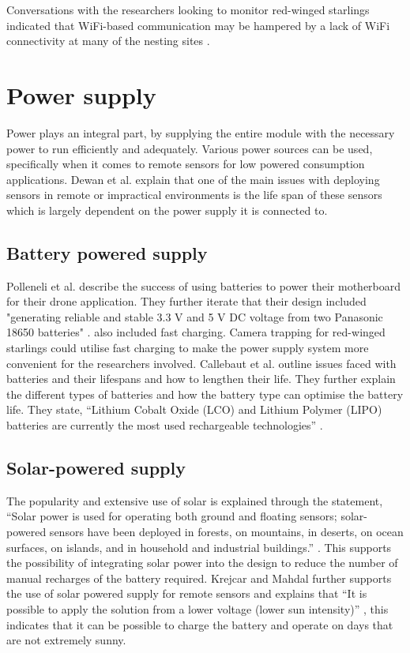 \documentclass[class=report,11pt,crop=false]{standalone}
\begin{document}
Conversations with the researchers looking to monitor red-winged starlings indicated that WiFi-based communication may be hampered by a lack of WiFi connectivity at many of the nesting sites \cite{hofmeyer2024private}.

\section{Power supply}

Power plays an integral part, by supplying the entire module with the necessary power to run efficiently and adequately. Various power sources can be used, specifically when it comes to remote sensors for low powered consumption applications. Dewan et al. \cite{dewan2014alternative} explain that one of the main issues with deploying sensors in remote or impractical environments is the life span of these sensors which is largely dependent on the power supply it is connected to. 

\subsection{Battery powered supply}

Polleneli et al. \cite{polonelli2020flexible} describe the success of using batteries to power their motherboard for their drone application. They further iterate that their design included "generating reliable and stable 3.3 V and 5 V DC voltage from two Panasonic 18650 batteries" \cite{polonelli2020flexible}. \cite{polonelli2020flexible} also included fast charging. Camera trapping for red-winged starlings could utilise fast charging to make the power supply system more convenient for the researchers involved. Callebaut et al. \cite{callebaut2021art} outline issues faced with batteries and their lifespans and how to lengthen their life. They further explain the different types of batteries and how the battery type can optimise the battery life. They state, “Lithium Cobalt Oxide (LCO) and Lithium Polymer (LIPO) batteries are currently the most used rechargeable technologies” \cite{callebaut2021art}.

\subsection{Solar-powered supply}

The popularity and extensive use of solar is explained through the statement, “Solar power is used for operating both ground and floating sensors; solar-powered sensors have been deployed in forests, on mountains, in deserts, on ocean surfaces, on islands, and in household and industrial buildings.” \cite{dewan2014alternative}. This supports the possibility of integrating solar power into the design to reduce the number of manual recharges of the battery required. Krejcar and Mahdal further supports the use of solar powered supply for remote sensors and explains that “It is possible to apply the solution from a lower voltage (lower sun intensity)” \cite{krejcar2012optimized}, this indicates that it can be possible to charge the battery and operate on days that are not extremely sunny.
\end{document}
